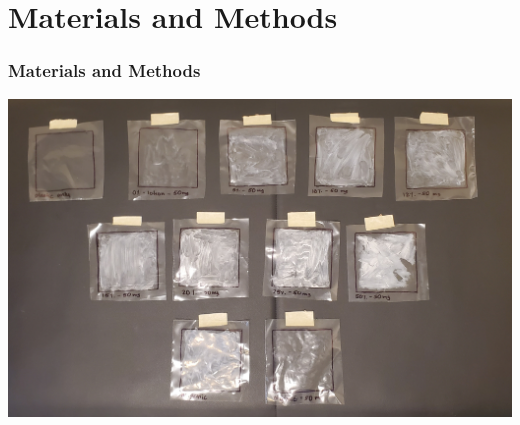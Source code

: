 \documentclass[10pt,aspectratio=169]{beamer} %
\begin{document}
\section{Materials and Methods}
\begin{frame}\centering
  \frametitle{Materials and Methods}
  \includegraphics[scale = 0.1]{Sunscreens.jpg}
\end{frame}
\end{document}

